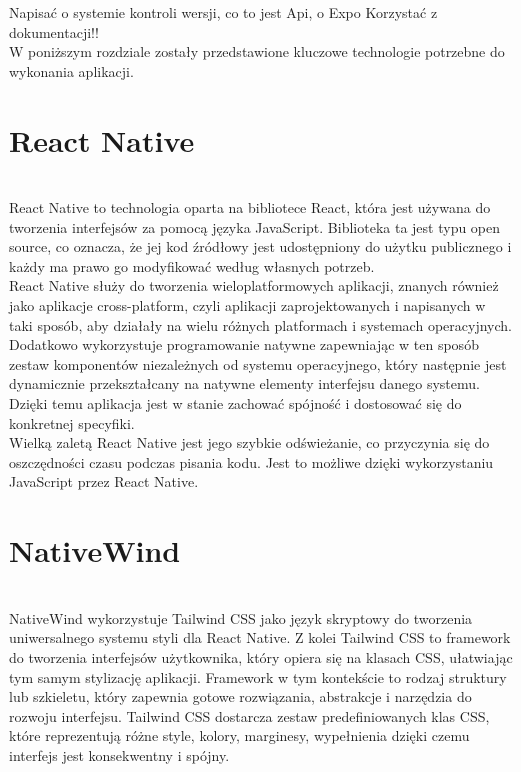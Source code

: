 Napisać o systemie kontroli wersji, co to jest Api, o Expo
Korzystać z dokumentacji!!\\

W poniższym rozdziale zostały przedstawione kluczowe technologie potrzebne do wykonania aplikacji.\\
\phantom{Th} 

\section{React Native}\\


\cite{reactnative} React Native to technologia oparta na bibliotece React, która jest używana do tworzenia interfejsów za pomocą języka JavaScript.  Biblioteka ta jest typu open source, co oznacza, że jej kod źródłowy jest udostępniony do użytku publicznego i każdy ma prawo go modyfikować według własnych potrzeb. \\
 
React Native służy do tworzenia wieloplatformowych aplikacji, znanych również jako aplikacje cross-platform, czyli aplikacji zaprojektowanych i napisanych w taki sposób, aby działały na wielu różnych platformach i systemach operacyjnych. Dodatkowo wykorzystuje programowanie natywne zapewniając w ten sposób zestaw komponentów niezależnych od systemu operacyjnego, który następnie jest dynamicznie przekształcany na natywne elementy interfejsu danego systemu. Dzięki temu aplikacja jest w stanie zachować spójność i dostosować się do  konkretnej specyfiki.\\

Wielką zaletą React Native jest jego szybkie odświeżanie, co przyczynia się do oszczędności czasu podczas pisania kodu. Jest to możliwe dzięki wykorzystaniu JavaScript przez React Native.\\


\section{NativeWind}\\

\cite{nativewind} NativeWind wykorzystuje Tailwind CSS jako język skryptowy do tworzenia uniwersalnego systemu styli dla React Native. Z kolei Tailwind CSS to framework do tworzenia interfejsów użytkownika, który opiera się na klasach CSS, ułatwiając tym samym stylizację aplikacji. Framework w tym kontekście to rodzaj struktury lub szkieletu, który zapewnia gotowe rozwiązania, abstrakcje i narzędzia do rozwoju interfejsu. Tailwind CSS dostarcza zestaw predefiniowanych klas CSS, które reprezentują różne style, kolory, marginesy, wypełnienia dzięki czemu interfejs jest konsekwentny i spójny.  \\


